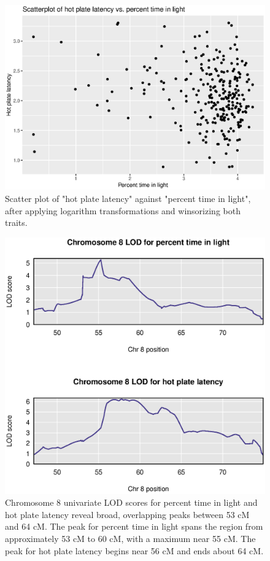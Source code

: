 \documentclass[12pt,twoside, lineno]{gsajnl}
\begin{document}
\begin{figure}
\includegraphics[width = \textwidth]{../Rmd/scatter.eps}
\caption{Scatter plot of "hot plate latency" against "percent time in
  light", after applying logarithm transformations and winsorizing
  both traits.}
\label{fig:scatter}
\end{figure}


\begin{figure}
\includegraphics[width = \textwidth]{../Rmd/chr8-lods.eps}
\caption{Chromosome 8 univariate LOD scores for percent time in light
  and hot plate latency reveal broad, overlapping peaks between 53 cM
  and 64 cM. The peak for percent time in light spans the region from
  approximately 53 cM to 60 cM, with a maximum near 55 cM. The peak
  for hot plate latency begins near 56 cM and ends about 64 cM.}
\label{fig:chr8-lod}
\end{figure}
\end{document}
